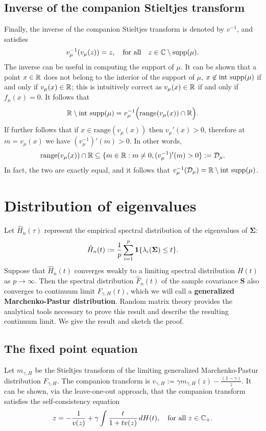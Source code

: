\documentclass{article}
\newcommand{\bSigma}{\boldsymbol{\Sigma}}
\newcommand{\bS}{\boldsymbol{S}}
\begin{document}
\subsection{Inverse of the companion Stieltjes transform}
Finally, the inverse of the companion Stieltjes transform is denoted by $v^{-1}$, and satisfies
$$
v_{\mu}^{-1}(v_{\mu}(z)) = z, \quad \textrm{for all}\quad z \in \mathbb{C}\setminus\mathrm{supp}(\mu).
$$
The inverse can be useful in computing the support of $\mu$. It can be shown that a point $x \in \mathbb{R}$ does not belong to the interior of the support of $\mu$, $x \not\in \mathrm{int}~\mathrm{supp}(\mu)$ if and only if $v_{\mu}(x) \in \mathbb{R}$; this is intuitively correct as $v_{\mu}(x) \in \mathbb{R}$ if and only if $f_{\mu}(x) = 0$. It follows that 
$$
\mathbb{R} \setminus \mathrm{int}~\mathrm{supp}(\mu) = v_{\mu}^{-1}\Big(\mathrm{range}(v_{\mu}(x)) \cap \mathbb{R}\Big).
$$
If further follows that if $x \in \mathrm{range}(v_{\mu}(x))$ then $v_{\mu}'(x) > 0$, therefore at $m = v_{\mu}(x)$ we have $(v_{\mu}^{-1})'(m) > 0$. In other words, 
$$
\mathrm{range}(v_{\mu}(x)) \cap \mathbb{R} \subseteq \{m \in \mathbb{R}: m \neq 0, (v_{\mu}^{-1})'(m) > 0 \} := \mathcal{D}_{\mu}.
$$
In fact, the two are exactly equal, and it follows that $v_{\mu}^{-1}(\mathcal{D}_{\mu}) = \mathbb{R} \setminus \mathrm{int}~\mathrm{supp}(\mu)$.




\section{Distribution of eigenvalues}
Let $\hat{H}_n(\tau)$ represent the empirical spectral distribution of the eigenvalues of $\bSigma$:
$$
\hat{H}_n(t) := \frac{1}{p} \sum_{i = 1}^{p} \1\{\lambda_i(\bSigma) \leq t\}.
$$
Suppose that $\hat{H}_n(t)$ converges weakly to a limiting spectral distribution $H(t)$ as $p \to \infty$. Then the spectral distribution $\hat{F}_n(t)$ of the sample covariance $\bS$ also converges to continuum limit $F_{\gamma,H}(t)$, which we will call a {\bf generalized Marchenko-Pastur distribution}. Random matrix theory provides the analytical tools necessary to prove this result and describe the resulting continuum limit. We give the result and sketch the proof.

\subsection{The fixed point equation}
Let $m_{\gamma,H}$ be the Stieltjes transform of the limiting generalized Marchenko-Pastur distribution $F_{\gamma,H}$. The companion transform is $v_{\gamma,H} := \gamma m_{\gamma,H}(z) - \frac{(1 - \gamma)}{z}$. It can be shown, via the leave-one-out approach, that the companion transform satisfies the self-consistency equation
\begin{equation}
	\label{eqn:silverstein}
	z = -\frac{1}{v(z)} + \gamma \int \frac{t}{1 + tv(z)} \,dH(t), \quad \textrm{for all $z \in \mathbb{C}_{+}$.}
\end{equation}
\end{document}
